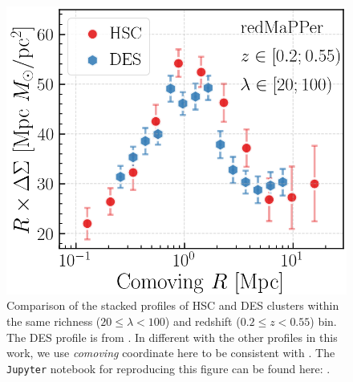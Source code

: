 \documentclass[fleqn,usenatbib,useAMS]{mnras}
\begin{document}
\begin{CJK*}{UTF8}{gbsn}
\begin{figure}
    \centering
    \includegraphics[width=\columnwidth]{figure/fig_G1}
    \caption{
        Comparison of the stacked \dsigma{} profiles of HSC and DES \redm{} clusters within 
        the same richness ($20 \leq \lambda < 100$) and redshift ($0.2 \leq z < 0.55$) bin.
        The DES \redm{} \dsigma{} profile is from \citet{Chang2018}.
        In different with the other \dsigma{} profiles in this work, we use \emph{comoving}
        coordinate here to be consistent with \citet{Chang2018}.
        The \texttt{Jupyter} notebook for reproducing this figure can be found here:
        \href{https://github.com/dr-guangtou/jianbing/blob/master/notebooks/figure/figG1.ipynb}{\faGithub}.
    }
    \label{fig:des_redm}
\end{figure}

\bsp
\label{lastpage}
\clearpage\end{CJK*}
\end{document}

